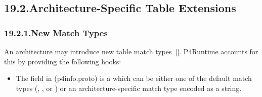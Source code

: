 \documentclass[11pt]{article}
\begin{document}
{%
\subsection{19.2.\hspace*{0.5em}Architecture-Specific Table Extensions}\label{sec-architecture-specific-table-extensions}%

\subsubsection{19.2.1.\hspace*{0.5em}New Match Types}\label{sec-new-match-types}%

\noindent{}An architecture may introduce new table match types~[]. P4Runtime
accounts for this by providing the following hooks:%

\begin{itemize}%

\item{}
The  field in  (p4info.proto) is a 
which can be either one of the default match types (, , 
or ) or an architecture-specific match type encoded as a string.%


\end{itemize}}
\end{document}
